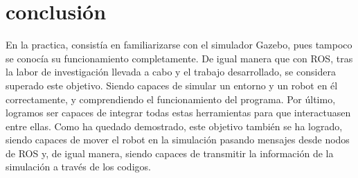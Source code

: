 \documentclass[11pt,a4paper,oldfontcommands,oneside]{memoir}
\begin{document}
\chapter{conclusión}
En la practica, consistía en familiarizarse con el simulador Gazebo, pues tampoco
se conocía su funcionamiento completamente. De igual manera
que con ROS, tras la labor de investigación llevada a cabo y el trabajo desarrollado, se
considera superado este objetivo. Siendo capaces de simular un entorno y un robot en
él correctamente, y comprendiendo el funcionamiento del programa.
Por último, logramos ser capaces de integrar todas estas herramientas para que
interactuasen entre ellas. Como ha quedado demostrado, este objetivo también se ha
logrado, siendo capaces de mover el robot en la simulación pasando mensajes desde
nodos de ROS y, de igual manera, siendo capaces de transmitir la información de la
simulación a través de los codigos.


\cite{joseph2018kick}
\cite{de2006robotica}
\hfill


\end{document}
